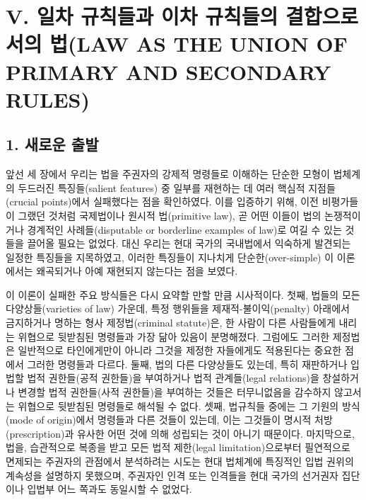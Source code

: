 \section{V. 일차 규칙들과 이차 규칙들의 결합으로서의 법(LAW AS THE UNION
OF PRIMARY AND SECONDARY
RULES)}\label{v.-uxc77cuxcc28-uxaddcuxce59uxb4e4uxacfc-uxc774uxcc28-uxaddcuxce59uxb4e4uxc758-uxacb0uxd569uxc73cuxb85cuxc11cuxc758-uxbc95law-as-the-union-of-primary-and-secondary-rules}

\subsection{1. 새로운 출발}\label{uxc0c8uxb85cuxc6b4-uxcd9cuxbc1c}

앞선 세 장에서 우리는 법을 주권자의 강제적 명령들로 이해하는 단순한
모형이 법체계의 두드러진 특징들(salient features) 중 일부를 재현하는 데
여러 핵심적 지점들(crucial points)에서 실패했다는 점을 확인하였다. 이를
입증하기 위해, 이전 비평가들이 그랬던 것처럼 국제법이나 원시적
법(primitive law), 곧 어떤 이들이 법의 논쟁적이거나 경계적인
사례들(disputable or borderline examples of law)로 여길 수 있는 것들을
끌어올 필요는 없었다. 대신 우리는 현대 국가의 국내법에서 익숙하게
발견되는 일정한 특징들을 지목하였고, 이러한 특징들이 지나치게
단순한(over-simple) 이 이론에서는 왜곡되거나 아예 재현되지 않는다는 점을
보였다.

이 이론이 실패한 주요 방식들은 다시 요약할 만할 만큼 시사적이다. 첫째,
법들의 모든 다양상들(varieties of law) 가운데, 특정 행위들을
제재적-불이익(penalty) 아래에서 금지하거나 명하는 형사 제정법(criminal
statute)은, 한 사람이 다른 사람들에게 내리는 위협으로 뒷받침된 명령들과
가장 닮아 있음이 분명해졌다. 그럼에도 그러한 제정법은 일반적으로
타인에게만이 아니라 그것을 제정한 자들에게도 적용된다는 중요한 점에서
그러한 명령들과 다르다. 둘째, 법의 다른 다양상들도 있는데, 특히
재판하거나 입법할 법적 권한들(공적 권한들)을 부여하거나 법적
관계들(legal relations)을 창설하거나 변경할 법적 권한들(사적 권한들)을
부여하는 것들은 터무니없음을 감수하지 않고서는 위협으로 뒷받침된
명령들로 해석될 수 없다. 셋째, 법규칙들 중에는 그 기원의 방식(mode of
origin)에서 명령들과 다른 것들이 있는데, 이는 그것들이 명시적
처방(prescription)과 유사한 어떤 것에 의해 성립되는 것이 아니기
때문이다. 마지막으로, 법을, 습관적으로 복종을 받고 모든 법적 제한(legal
limitation)으로부터 필연적으로 면제되는 주권자의 관점에서 분석하려는
시도는 현대 법체계에 특징적인 입법 권위의 계속성을 설명하지 못했으며,
주권자인 인격 또는 인격들을 현대 국가의 선거권자 집단이나 입법부 어느
쪽과도 동일시할 수 없었다.


